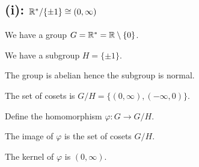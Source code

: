 \documentclass[12pt]{article}
\begin{document}
\subsection*{(i): $\mathbb{R}^*/\{\pm 1\} \cong (0, \infty)$}

We have a group $G = \mathbb{R}^* = \mathbb{R}\setminus\{0\}$.

We have a subgroup $H = \{\pm 1\}$.

The group is abelian hence the subgroup is normal.

The set of cosets is $G/H = \{(0, \infty), (-\infty, 0)\}$.

Define the homomorphism $\varphi: G \to G/H$.

The image of $\varphi$ is the set of cosets $G/H$.

The kernel of $\varphi$ is $(0, \infty)$.
\end{document}

